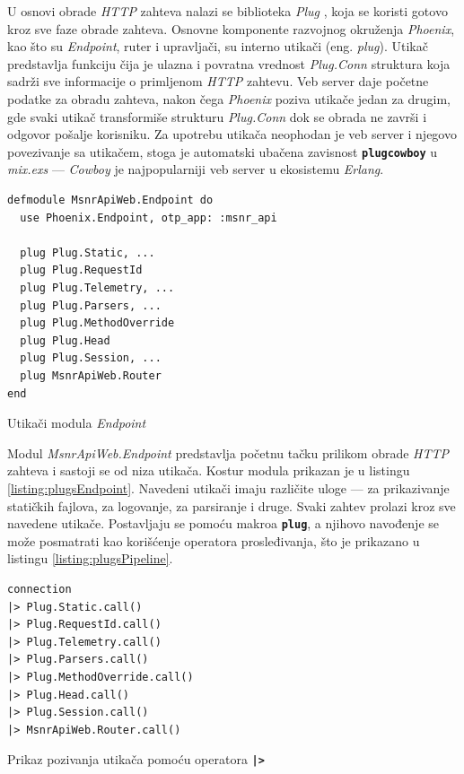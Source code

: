 \documentclass[12pt,oneside]{memoir}
\begin{document}
U osnovi obrade \emph{HTTP} zahteva nalazi se biblioteka \emph{Plug} \cite{plug}, koja se koristi gotovo kroz sve faze obrade zahteva.
Osnovne komponente razvojnog okruženja \emph{Phoenix}, kao što su \emph{Endpoint}, ruter i upravljači, su interno utikači (eng. \emph{plug}).
Utikač predstavlja funkciju čija je ulazna i povratna vrednost \emph{Plug.Conn} struktura koja sadrži sve informacije o
primljenom \emph{HTTP} zahtevu. Veb server daje početne podatke za obradu zahteva, nakon čega \emph{Phoenix} poziva utikače jedan za drugim,
gde svaki utikač transformiše strukturu \emph{Plug.Conn} dok se obrada ne završi i odgovor pošalje korisniku. Za upotrebu utikača neophodan je
veb server i njegovo povezivanje sa utikačem, stoga je automatski ubačena zavisnost \texttt{\textbf{plug{\textunderscore}cowboy}} u \emph{mix.exs}
--- \emph{Cowboy} je najpopularniji veb server u ekosistemu \emph{Erlang}.

\begin{listing}[!ht]
\begin{verbatim}
defmodule MsnrApiWeb.Endpoint do
  use Phoenix.Endpoint, otp_app: :msnr_api

  plug Plug.Static, ...
  plug Plug.RequestId
  plug Plug.Telemetry, ...
  plug Plug.Parsers, ...
  plug Plug.MethodOverride
  plug Plug.Head
  plug Plug.Session, ...
  plug MsnrApiWeb.Router
end
\end{verbatim}
\caption{Utikači modula \emph{Endpoint}}
\label{listing:plugsEndpoint}
\end{listing}
Modul \emph{MsnrApiWeb.Endpoint} predstavlja početnu tačku prilikom obrade \emph{HTTP} zahteva i sastoji se od niza utikača. Kostur
modula prikazan je u listingu \ref{listing:plugsEndpoint}. Navedeni utikači imaju različite uloge --- za prikazivanje statičkih fajlova, za logovanje,
za parsiranje i druge. Svaki zahtev prolazi kroz sve navedene utikače. Postavljaju se pomoću makroa \texttt{\textbf{plug}}, a njihovo
navođenje se može posmatrati kao korišćenje operatora prosleđivanja, što je prikazano u listingu \ref{listing:plugsPipeline}.
\begin{listing}[!h]
\begin{verbatim}
connection
|> Plug.Static.call()
|> Plug.RequestId.call()
|> Plug.Telemetry.call()
|> Plug.Parsers.call()
|> Plug.MethodOverride.call()
|> Plug.Head.call()
|> Plug.Session.call()
|> MsnrApiWeb.Router.call()
\end{verbatim}
\caption{Prikaz pozivanja utikača pomoću operatora \texttt{\textbf{|>}}}
\label{listing:plugsPipeline}
\end{listing}
\end{document}
